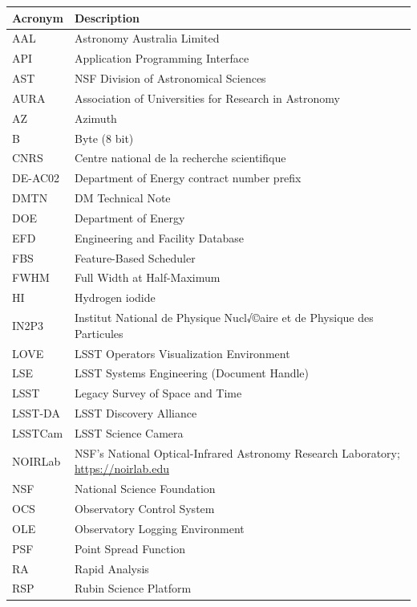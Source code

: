 \addtocounter{table}{-1}
\begin{longtable}{p{}p{}}\hline
\textbf{Acronym} & \textbf{Description}  \\\hline

AAL & Astronomy Australia Limited \\\hline
API & Application Programming Interface \\\hline
AST & NSF Division of Astronomical Sciences \\\hline
AURA & Association of Universities for Research in Astronomy \\\hline
AZ & Azimuth \\\hline
B & Byte (8 bit) \\\hline
CNRS & Centre national de la recherche scientifique \\\hline
DE-AC02 & Department of Energy contract number prefix \\\hline
DMTN & DM Technical Note \\\hline
DOE & Department of Energy \\\hline
EFD & Engineering and Facility Database \\\hline
FBS & Feature-Based Scheduler \\\hline
FWHM & Full Width at Half-Maximum \\\hline
HI & Hydrogen iodide \\\hline
IN2P3 & Institut National de Physique Nucl√©aire et de Physique des Particules \\\hline
LOVE & LSST Operators Visualization Environment \\\hline
LSE & LSST Systems Engineering (Document Handle) \\\hline
LSST & Legacy Survey of Space and Time \\\hline
LSST-DA & LSST Discovery Alliance \\\hline
LSSTCam & LSST Science Camera \\\hline
NOIRLab & NSF's National Optical-Infrared Astronomy Research Laboratory; \url{https://noirlab.edu} \\\hline
NSF & National Science Foundation \\\hline
OCS & Observatory Control System \\\hline
OLE & Observatory Logging Environment \\\hline
PSF & Point Spread Function \\\hline
RA & Rapid Analysis \\\hline
RSP & Rubin Science Platform \\\hline

\end{longtable}
